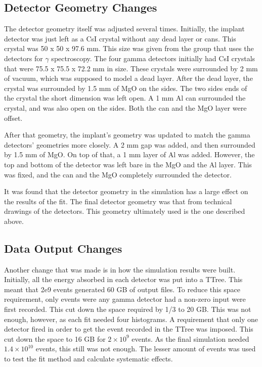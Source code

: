 \documentclass[../MaxHughesThesis.tex]{subfiles}
\begin{document}
\subsection{Detector Geometry Changes}
The detector geometry itself was adjusted several times.
Initially, the implant detector was just left as a CsI crystal without any dead layer or cans.
This crystal was 50 x 50 x 97.6 mm.
This size was given from the group that uses the detectors for $\gamma$ spectroscopy.
The four gamma detectors initially had CsI crystals that were 75.5 x 75.5 x 72.2 mm in size.
These crystals were surrounded by 2 mm of vacuum, which was supposed to model a dead layer.
After the dead layer, the crystal was surrounded by 1.5 mm of MgO on the sides.
The two sides ends of the crystal the short dimension was left open.
A 1 mm Al can surrounded the crystal, and was also open on the sides.
Both the can and the MgO layer were offset.

After that geometry, the implant's geometry was updated to match the gamma detectors' geometries more closely.
A 2 mm gap was added, and then surrounded by 1.5 mm of MgO. 
On top of that, a 1 mm layer of Al was added.
However, the top and bottom of the detector was left bare in the MgO and the Al layer.
This was fixed, and the can and the MgO completely surrounded the detector.

It was found that the detector geometry in the simulation has a large effect on the results of the fit.
The final detector geometry was that from technical drawings of the detectors.
This geometry ultimately used  is the one described above. 

\subsection{Data Output Changes}
Another change that was made is in how the simulation results were built.
Initially, all the energy absorbed in each detector was put into a TTree.
This meant that 2e9 events generated 60 GB of output files.
To reduce this space requirement, only events were any gamma detector had a non-zero input were first recorded.
This cut down the space required by 1/3 to 20 GB.
This was not enough, however, as each fit needed four histograms.
A requirement that only one detector fired in order to get the event recorded in the TTree was imposed. 
This cut down the space to 16 GB for $2 \times 10^{9}$ events.
As the final simulation needed $1.4 \times 10^{10}$ events, this still was not enough.
The lesser amount of events was used to test the fit method and calculate systematic effects.
\end{document}
